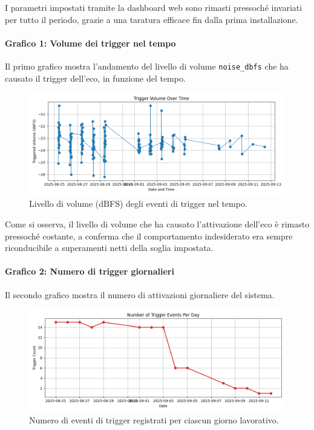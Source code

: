 \documentclass[fleqn,10pt]{SelfArx} %
\begin{document}
I parametri impostati tramite la dashboard web sono rimasti pressoché invariati per tutto il periodo, grazie a una taratura efficace fin dalla prima installazione.

\paragraph{Grafico 1: Volume dei trigger nel tempo}

Il primo grafico mostra l'andamento del livello di volume \texttt{noise\_dbfs} che ha causato il trigger dell'eco, in funzione del tempo.

\begin{figure}[h!]
	\centering
	\includegraphics[width=0.92\linewidth]{trigger_volume_vs_time.png}
	\caption{Livello di volume (dBFS) degli eventi di trigger nel tempo.}
	\label{fig:trigger_volume_time}
\end{figure}

Come si osserva, il livello di volume che ha causato l'attivazione dell'eco è rimasto pressoché costante, a conferma che il comportamento indesiderato era sempre riconducibile a superamenti netti della soglia impostata.

\paragraph{Grafico 2: Numero di trigger giornalieri}

Il secondo grafico mostra il numero di attivazioni giornaliere del sistema.

\begin{figure}[h!]
	\centering
	\includegraphics[width=0.92\linewidth]{trigger_count_per_day.png}
	\caption{Numero di eventi di trigger registrati per ciascun giorno lavorativo.}
	\label{fig:trigger_count_day}
\end{figure}
\end{document}
